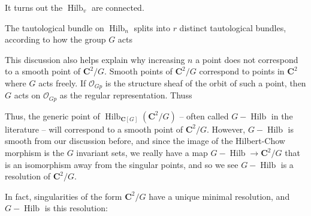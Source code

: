 \documentclass{amsart}[12pt]
\theoremstyle{definition}
\newcommand{\C}{\mathbf{C}}
\DeclareMathOperator{\Hilb}{Hilb}
\begin{document}
It turns out the $\Hilb_v$ are connected.  

The tautological bundle on $\Hilb_n$ splits into $r$ distinct tautological bundles, according to how the group $G$ acts 


This discussion also helps explain why increasing $n$ a point does not correspond to a smooth point of $\C^2/G$.  Smooth points of $\C^2/G$ correspond to points in $\C^2$ where $G$ acts freely.  If $\mathcal{O}_{Gp}$ is the structure sheaf of the orbit of such a point, then $G$ acts on $\mathcal{O}_{Gp}$ as the regular representation.  Thuss

Thus, the generic point of $\Hilb_{\C[G]}({\C^2/G})$ -- often called $G-\Hilb$ in the literature -- will correspond to a smooth point of $\C^2/G$.  However, $G-\Hilb$ is smooth from our discussion before, and since the image of the Hilbert-Chow morphism is the $G$ invariant sets, we really have a map $G-\Hilb\to \C^2/G$ that is an isomorphism away from the singular points, and so we see $G-\Hilb$ is a resolution of $\C^2/G$. 

\begin{center}
\end{center}

In fact, singularities of the form $\C^2/G$ have a unique minimal resolution, and $G-\Hilb$ is this resolution:
\end{document}

